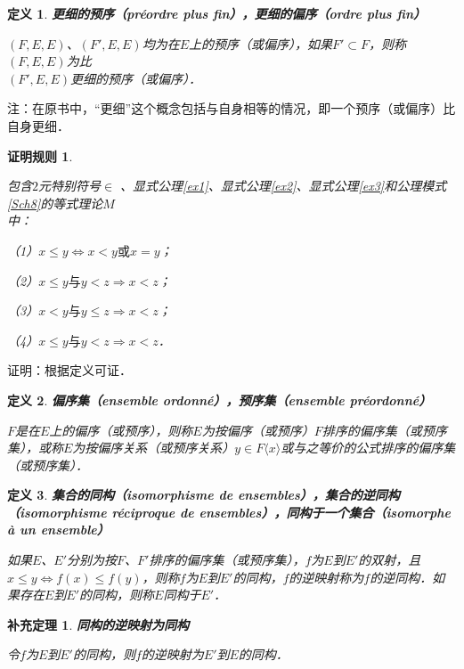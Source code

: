 \documentclass[12pt, a4paper, oneside]{book}
\newtheorem{C}{证明规则}
\newtheorem{cor}{补充定理}
\newtheorem{de}{定义}
\begin{document}
			\begin{de}
				\textbf{更细的预序（préordre plus fin），更细的偏序（ordre plus fin）}
				\par
				$(F, E, E)$、$(F', E, E)$均为在$E$上的预序（或偏序），如果$F'\subset F$，则称$(F, E, E)$为比\\$(F', E, E)$更细的预序（或偏序）．
			\end{de}
			注：在原书中，“更细”这个概念包括与自身相等的情况，即一个预序（或偏序）比自身更细．
			
			\begin{C}\label{C58}
				\hfill\par
				包含$2$元特别符号$\in$ 、显式公理\ref{ex1}、显式公理\ref{ex2}、显式公理\ref{ex3}和公理模式\ref{Sch8}的等式理论$M$\\中：
				\par
				（1）$x\leq y\Leftrightarrow x<y\text{或}x=y$；
				\par
				（2）$x\leq y\text{与}y<z\Rightarrow x<z$；
				\par
				（3）$x<y\text{与}y\leq z\Rightarrow x<z$；
				\par
				（4）$x\leq y\text{与}y<z\Rightarrow x<z$．
			\end{C}
			证明：根据定义可证．
			
			\begin{de}
				\textbf{偏序集（ensemble ordonné），预序集（ensemble préordonné）}
				\par
				$F$是在$E$上的偏序（或预序），则称$E$为按偏序（或预序）$F$排序的偏序集（或预序集），或称$E$为按偏序关系（或预序关系）$y\in F\langle x \rangle $或与之等价的公式排序的偏序集（或预序集）．
			\end{de}

			\begin{de}
				\textbf{集合的同构（isomorphisme de ensembles），集合的逆同构（isomorphisme réciproque de ensembles），同构于一个集合（isomorphe à un ensemble）}
				\par
				如果$E$、$E'$分别为按$F$、$F'$排序的偏序集（或预序集），$f$为$E$到$E'$的双射，且$x\leq y\Leftrightarrow f(x)\leq f(y)$，则称$f$为$E$到$E'$的同构，$f$的逆映射称为$f$的逆同构．如果存在$E$到$E'$的同构，则称$E$同构于$E'$．
			\end{de}

			\begin{cor}\label{cor157}
				\textbf{同构的逆映射为同构}
				\par
				令$f$为$E$到$E'$的同构，则$f$的逆映射为$E'$到$E$的同构．
			\end{cor}
\end{document}
